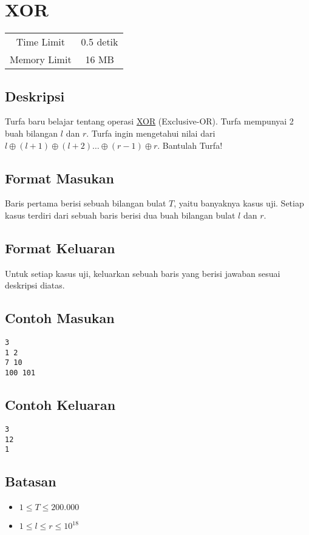 \documentclass{article}
\begin{document}
\section*{\hfil XOR\hfil}

\begin{center}
\begin{tabular}{ |cc| } 
 \hline
 Time Limit & 0.5 detik \\ 
 Memory Limit & 16 MB \\
 \hline
\end{tabular}
\end{center}

\subsection*{Deskripsi}
\par Turfa baru belajar tentang operasi \href{https://en.wikipedia.org/wiki/Exclusive_or}{XOR} (Exclusive-OR). Turfa mempunyai 2 buah bilangan $l$ dan $r$. Turfa ingin mengetahui nilai dari $l \oplus (l + 1) \oplus (l + 2) \dots \oplus (r - 1) \oplus r$. Bantulah Turfa!

\subsection*{Format Masukan}
\par Baris pertama berisi sebuah bilangan bulat $T$, yaitu banyaknya kasus uji.
\newline Setiap kasus terdiri dari sebuah baris berisi dua buah bilangan bulat $l$ dan $r$.

\subsection*{Format Keluaran}

\par Untuk setiap kasus uji, keluarkan sebuah baris yang berisi jawaban sesuai deskripsi diatas. 

\subsection*{Contoh Masukan}

\begin{lstlisting}
3
1 2
7 10
100 101

\end{lstlisting}

\subsection*{Contoh Keluaran}

\begin{lstlisting}
3
12
1

\end{lstlisting}

\subsection*{Batasan}

\begin{itemize}
	\item $1 \leq T\leq 200.000$
	\item $1 \leq l \leq r \leq 10^{18}$
\end{itemize}
\end{document}
